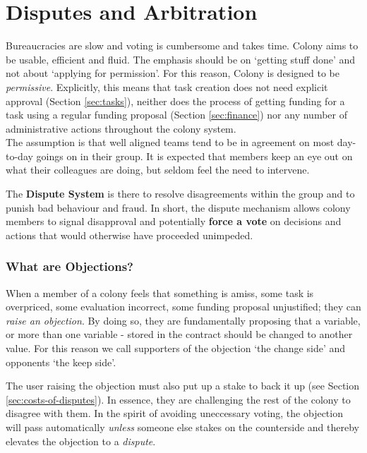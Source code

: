 \section{Disputes and Arbitration}\label{sec:disputes}
Bureaucracies are slow and voting is cumbersome and takes time. Colony aims to be usable, efficient and fluid. The emphasis should be on `getting stuff done' and not about `applying for permission'. For this reason, Colony is designed to be \emph{permissive}. Explicitly, this means that task creation does not need explicit approval (Section \ref{sec:tasks}), neither does the process of getting funding for a task using a regular funding proposal (Section \ref{sec:finance}) nor any number of administrative actions throughout the colony system.\\
The assumption is that well aligned teams tend to be in agreement on most day-to-day goings on in their group. It is expected that members keep an eye out on what their colleagues are doing, but seldom feel the need to intervene. 

The \textbf{Dispute System} is there to resolve disagreements within the group and to punish bad behaviour and fraud. In short, the dispute mechanism allows colony members to signal disapproval and potentially \textbf{force a vote} on decisions and actions that would otherwise have proceeded unimpeded.


\subsubsection*{What are Objections?}
When a member of a colony feels that something is amiss, some task is overpriced, some evaluation incorrect, some funding proposal unjustified; they can \emph{raise an objection}. By doing so, they are fundamentally proposing that a variable, or more than one variable - stored in the  contract should be changed to another value. For this reason we call supporters of the objection `the change side' and opponents `the keep side'.

The user raising the objection must also put up a stake to back it up (see Section \ref{sec:costs-of-disputes}). In essence, they are challenging the rest of the colony to disagree with them. In the spirit of avoiding uneccessary voting, the objection will pass automatically \emph{unless} someone else stakes on the counterside and thereby elevates the objection to a \emph{dispute}.

